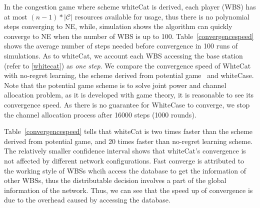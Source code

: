 \documentclass[times]{ettauth}
\theoremstyle{mytheoremstyle}
\theoremstyle{mytheoremstyle}
\theoremstyle{mytheoremstyle}
\begin{document}
In the congestion game where scheme whiteCat is derived, each player (WBS) has at most $(n-1)*|\mathcal{C}|$ resources available for usage, thus there is no polynomial steps converging to NE, while, simulation shows the algorithm can quickly converge to NE when the number of WBS is up to 100. 
%
Table~\ref{convergencespeed} shows the average number of steps needed before convergence in 100 runs of simulations.
As to whiteCat, we account each WBS accessing the base station (refer to \ref{whitecat}) as \textit{one step}.
We compare the convergence speed of WhteCat with no-regret learning, the scheme derived from potential game~\cite{pimrc_2012} and whiteCase.
Note that the potential game scheme is to solve joint power and channel allocation problem, as it is developed with game theory, it is reasonable to see its convergence speed.
As there is no guarantee for WhiteCase to converge, we stop the channel allocation process after 16000 steps (1000 rounds).

Table~\ref{convergencespeed} tells that whiteCat is two times faster than the scheme derived from potential game, and 20 times faster than no-regret learning scheme.
The relatively smaller confidence interval shows that whiteCat's convergence is not affected by different network configurations.
Fast converge is attributed to the working style of WBSs whcih access the database to get the information of other WBSs, thus the distributable decision involves a part of the global information of the network.
Thus, we can see that the speed up of convergence is due to the overhead caused by accessing the database.
\end{document}
